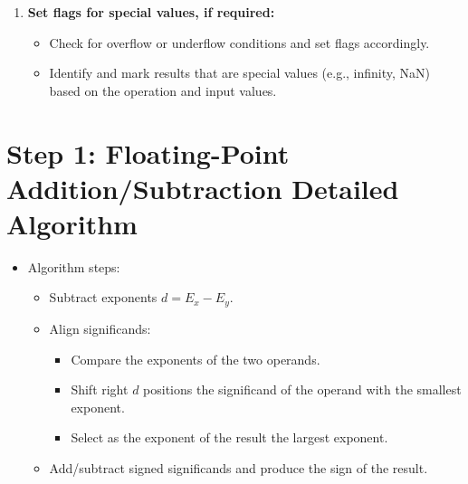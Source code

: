 \documentclass[12pt,openany, tikz,border=10pt]{book}
\begin{document}
\begin{itemize}
\begin{enumerate}
			      		      	\item \textbf{Set flags for special values, if required:}
			      		      	      \begin{itemize}
			      		      	      	\item Check for overflow or underflow conditions and set flags accordingly.
			      		      	      	\item Identify and mark results that are special values (e.g., infinity, NaN) based on the operation and input values.
			      		      	      \end{itemize}
			      		      \end{enumerate}
			      	\end{itemize}
			      	    
			      	\section*{Step 1: Floating-Point Addition/Subtraction Detailed Algorithm}
			      	\begin{itemize}
			      		\item[] Algorithm steps:
			      		      \begin{itemize}
			      		      	\item Subtract exponents \(d = E_x - E_y\).
			      		      	\item Align significands:
			      		      	      \begin{itemize}
			      		      	      	\item Compare the exponents of the two operands.
			      		      	      	\item Shift right \(d\) positions the significand of the operand with the smallest exponent.
			      		      	      	\item Select as the exponent of the result the largest exponent.
			      		      	      \end{itemize}
			      		      	\item Add/subtract signed significands and produce the sign of the result.
			      		      \end{itemize}
			      	\end{itemize}
			      	    
\end{document}
